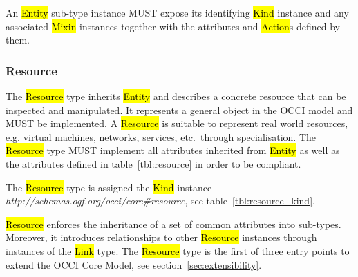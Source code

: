 \documentclass[10pt,a4paper]{article}
\begin{document}
An \hl{Entity} sub-type instance MUST expose its identifying \hl{Kind} instance
and any associated \hl{Mixin} instances together with the attributes and
\hl{Action}s defined by them.

\subsubsection{Resource}
\label{sec:resource}
The \hl{Resource} type inherits \hl{Entity} and describes a concrete resource that
can be inspected and manipulated. It represents a general object in the OCCI
model and MUST be implemented. A \hl{Resource} is suitable to represent real
world resources, e.g. virtual machines, networks, services, etc.~through specialisation.
%
The \hl{Resource} type MUST implement all attributes inherited from \hl{Entity}
as well as the attributes defined in table~\ref{tbl:resource} in order
to be compliant.


The \hl{Resource} type is assigned the \hl{Kind} instance
\textit{http://schemas.ogf.org/occi/core\#resource}, see
table~\ref{tbl:resource_kind}.
%

\hl{Resource} enforces the inheritance of a set of common attributes into
sub-types. Moreover, it introduces relationships to other \hl{Resource}
instances through instances of the \hl{Link} type.
%
The \hl{Resource} type is the first of three entry points to extend the OCCI Core
Model, see section~\ref{sec:extensibility}.
\end{document}
